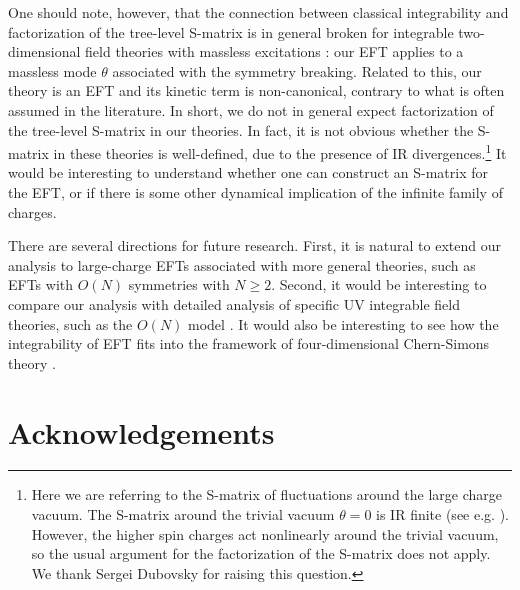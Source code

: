 \documentclass[12pt]{article}
\begin{document}
One should note, however, that the connection between classical integrability and factorization of the tree-level S-matrix
is in general broken for  integrable two-dimensional field theories with massless excitations \cite{Hoare:2018jim}:
our EFT applies to a massless mode $\theta$ associated with the symmetry breaking. 
Related to this, our theory is an EFT and its kinetic term is 
non-canonical, contrary to what is often assumed in the literature. In short, we do not in general
expect factorization of the tree-level S-matrix in our theories. In fact, it is not obvious whether the S-matrix in these theories is well-defined, due to the presence of IR divergences.\footnote{Here we are referring to the S-matrix of fluctuations around the large charge vacuum. The S-matrix around the trivial vacuum $\theta=0$ is IR finite (see e.g. \cite{Dubovsky:2012sh}).  However, the higher spin charges act nonlinearly around the trivial vacuum, so the usual argument \cite{Parke:1980ki,Dorey:1996gd} for the factorization of the S-matrix does not apply. We thank Sergei Dubovsky for raising this question.} It would be interesting to understand whether one can construct an S-matrix for the EFT, or if there is some other dynamical implication of the infinite family of charges.

There are several directions for future research. First, it is natural to extend our analysis to 
large-charge EFTs associated with more general theories, such as EFTs with $O(N)$ symmetries with $N\ge 2$.
Second, it would be interesting to compare our analysis with 
detailed analysis of specific UV integrable field theories, 
such as the $O(N)$ model \cite{DiPietro:2021yxb,Marino:2021dzn}.
It would also be interesting to see how the integrability of EFT fits into the framework of four-dimensional Chern-Simons theory \cite{Costello:2019tri,Ashwinkumar:2023zbu}.

\section*{Acknowledgements}
\end{document}
